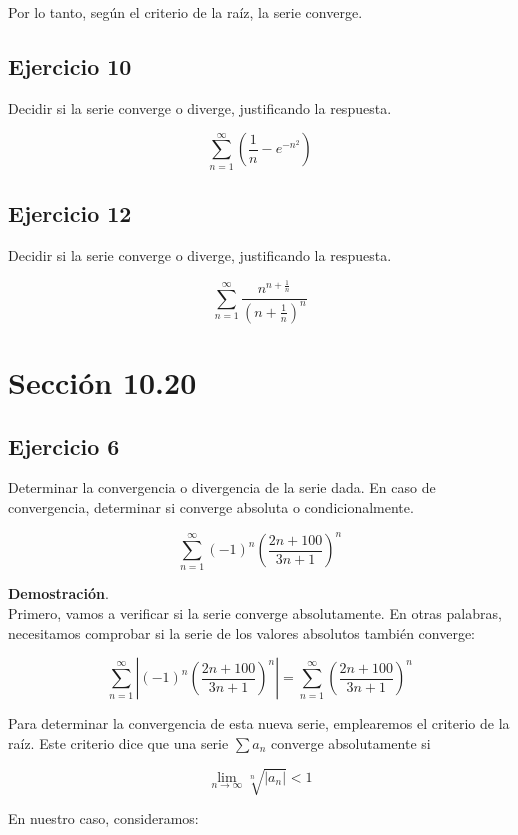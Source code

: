 \documentclass{article}
\begin{document}
    Por lo tanto, según el criterio de la raíz, la serie converge.

    \subsection*{Ejercicio 10}

    Decidir si la serie converge o diverge, justificando la respuesta.

    $$
    \sum_{n=1}^{\infty}\left(\frac{1}{n}-e^{-n^{2}}\right)
    $$

    \subsection*{Ejercicio 12}

    Decidir si la serie converge o diverge, justificando la respuesta.

    $$
    \sum_{n=1}^{\infty} \frac{n^{n+\frac{1}{n}}}{\left(n+\frac{1}{n}\right)^{n}}
    $$
    \section*{Sección 10.20}
    \subsection*{Ejercicio 6}

    Determinar la convergencia o divergencia de la serie dada. En caso de convergencia, determinar si converge absoluta o condicionalmente.

    $$
    \sum_{n=1}^{\infty}(-1)^{n}\left(\frac{2 n+100}{3 n+1}\right)^{n}
    $$

    \textbf{Demostración}.\\

    Primero, vamos a verificar si la serie converge absolutamente. En otras palabras, necesitamos comprobar si la serie de los valores absolutos también converge:

    $$
    \sum_{n=1}^{\infty}\left|(-1)^{n}\left(\frac{2 n+100}{3 n+1}\right)^{n}\right|=\sum_{n=1}^{\infty}\left(\frac{2 n+100}{3 n+1}\right)^{n}
    $$

    Para determinar la convergencia de esta nueva serie, emplearemos el criterio de la raíz. Este criterio dice que una serie \(\sum a_n\) converge absolutamente si

    \[
    \lim_{n \to \infty} \sqrt[n]{|a_n|} < 1
    \]

    En nuestro caso, consideramos:
\end{document}
